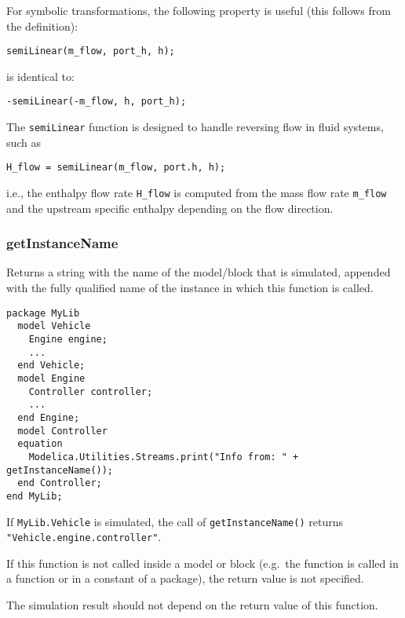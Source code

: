 \begin{nonnormative}
For symbolic transformations, the following property is useful
(this follows from the definition):
\begin{lstlisting}[language=modelica]
semiLinear(m_flow, port_h, h);
\end{lstlisting}
is identical to:
\begin{lstlisting}[language=modelica]
-semiLinear(-m_flow, h, port_h);
\end{lstlisting}

The \lstinline!semiLinear! function is designed to handle reversing
flow in fluid systems, such as
\begin{lstlisting}[language=modelica]
H_flow = semiLinear(m_flow, port.h, h);
\end{lstlisting}
i.e., the enthalpy flow rate \lstinline!H_flow! is computed from the
mass flow rate \lstinline!m_flow! and the upstream specific enthalpy
depending on the flow direction.
\end{nonnormative}

\subsubsection{getInstanceName}\label{getinstancename}

Returns a string with the name of the model/block that is simulated,
appended with the fully qualified name of the instance in which this
function is called.

\begin{example}
\begin{lstlisting}[language=modelica]
package MyLib
  model Vehicle
    Engine engine;
    ...
  end Vehicle;
  model Engine
    Controller controller;
    ...
  end Engine;
  model Controller
  equation
    Modelica.Utilities.Streams.print("Info from: " + getInstanceName());
  end Controller;
end MyLib;
\end{lstlisting}
If \lstinline!MyLib.Vehicle! is simulated, the call of \lstinline!getInstanceName()!
returns \lstinline!"Vehicle.engine.controller"!.
\end{example}

If this function is not called inside a model or block (e.g.\ the
function is called in a function or in a constant of a package), the
return value is not specified.

\begin{nonnormative}
The simulation result should not depend on the return value of this function.
\end{nonnormative}

